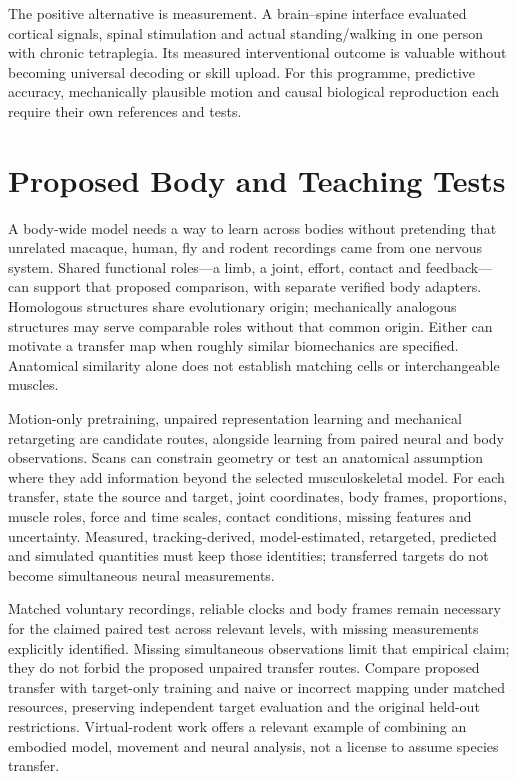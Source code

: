 The positive alternative is measurement. A brain--spine interface evaluated
cortical signals, spinal stimulation and actual standing/walking in one person
with chronic tetraplegia. Its measured interventional outcome is valuable
without becoming universal decoding or skill upload.\citep{lorach2023}
For this programme, predictive accuracy, mechanically plausible motion and
causal biological reproduction each require their own references and tests.


\section{Proposed Body and Teaching Tests}

A body-wide model needs a way to learn across bodies without pretending that unrelated macaque, human, fly and rodent recordings came from one nervous system. Shared functional roles---a limb, a joint, effort, contact and feedback---can support that proposed comparison, with separate verified body adapters. Homologous structures share evolutionary origin; mechanically analogous structures may serve comparable roles without that common origin. Either can motivate a transfer map when roughly similar biomechanics are specified. Anatomical similarity alone does not establish matching cells or interchangeable muscles.

Motion-only pretraining, unpaired representation learning and mechanical retargeting are candidate routes, alongside learning from paired neural and body observations. Scans can constrain geometry or test an anatomical assumption where they add information beyond the selected musculoskeletal model. For each transfer, state the source and target, joint coordinates, body frames, proportions, muscle roles, force and time scales, contact conditions, missing features and uncertainty. Measured, tracking-derived, model-estimated, retargeted, predicted and simulated quantities must keep those identities; transferred targets do not become simultaneous neural measurements.

Matched voluntary recordings, reliable clocks and body frames remain necessary for the claimed paired test across relevant levels, with missing measurements explicitly identified. Missing simultaneous observations limit that empirical claim; they do not forbid the proposed unpaired transfer routes. Compare proposed transfer with target-only training and naive or incorrect mapping under matched resources, preserving independent target evaluation and the original held-out restrictions. Virtual-rodent work offers a relevant example of combining an embodied model, movement and neural analysis, not a license to assume species transfer.
\citep{virtualrodent2024}

